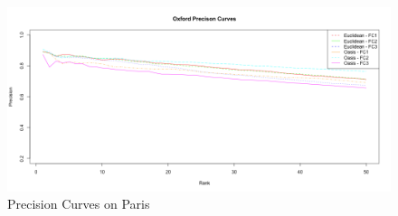 \documentclass{report}
\begin{document}
      \begin{figure}[H]
        \caption{Precision Curves on Paris}
        \centering
        \includegraphics[scale=0.45]{images/evaluation/paris_prec_curves.png}
      \end{figure}
\end{document}
